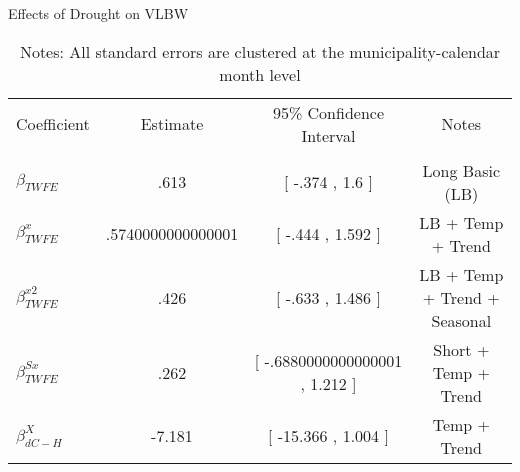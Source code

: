 \begin{table}[!ht]
\centering
\caption{Effects of Drought on VLBW}\label{tab:twfe_vlbw_test}
\renewcommand{\arraystretch}{1.5}
\fontsize{10pt}{12pt}\selectfont
\begin{tabular}{lccc}
\toprule
 \multicolumn{1}{c}{Coefficient}  &\multicolumn{1}{c}{Estimate}&\multicolumn{1}{c}{95\% Confidence Interval}&\multicolumn{1}{c}{Notes}\\\cmidrule(lr){2-2}\cmidrule(lr){3-3}\cmidrule(lr){4-4} \\
\midrule
 $ \beta_{TWFE} $ & .613  & [ -.374 ,  1.6 ] & Long Basic (LB) \\
 $ \beta^{x}_{TWFE} $ & .5740000000000001  &  [ -.444 ,  1.592  ] & LB + Temp + Trend \\
 $ \beta^{x2}_{TWFE} $ & .426  & [ -.633 ,  1.486  ] & LB + Temp + Trend + Seasonal \\
 $ \beta^{Sx}_{TWFE} $ & .262  & [ -.6880000000000001 ,  1.212  ] & Short + Temp + Trend \\
 $ \beta^{X}_{dC-H} $ & -7.181  & [ -15.366 ,  1.004 ] & Temp + Trend \\
\bottomrule
\end{tabular}
\caption*{\footnotesize{Notes: All standard errors are clustered at the municipality-calendar month level}}
\end{table}
